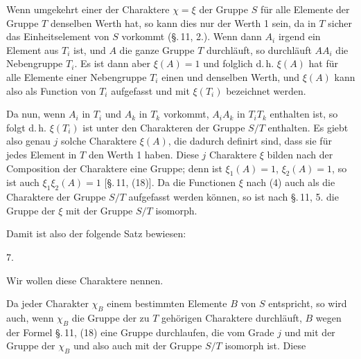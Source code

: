 
Wenn umgekehrt einer der Charaktere $\chi = \xi$ der Gruppe $S$
für alle Elemente der Gruppe $T$ denselben Werth hat, so kann
dies nur der Werth 1 sein, da in $T$ sicher das Einheitselement
von $S$ vorkommt (\S.\,11, 2.). Wenn dann $A_i$ irgend ein Element
aus $T_i$ ist, und $A$ die ganze Gruppe $T$ durchläuft, so
durchläuft $AA_i$ die Nebengruppe $T_i$. Es ist dann aber
$\xi(A) = 1$ und folglich
d.\,h. $\xi(A)$ hat für alle Elemente einer Nebengruppe $T_i$ einen
und denselben Werth, und $\xi(A)$ kann also als Function von $T_i$
aufgefasst und mit $\xi(T_i)$ bezeichnet werden.

Da nun, wenn $A_i$ in $T_i$ und $A_k$ in $T_k$ vorkommt, $A_iA_k$
in $T_iT_k$ enthalten ist, so folgt
d.\,h. $\xi(T_i)$ ist unter den Charakteren der Gruppe $S/T$
enthalten. Es giebt also genau $j$ solche Charaktere $\xi(A)$, die
dadurch definirt sind, dass sie für jedes Element in $T$ den Werth
1 haben. Diese $j$ Charaktere $\xi$ bilden nach der Composition
der Charaktere eine Gruppe; denn ist $\xi_1(A) = 1$,
$\xi_2(A) = 1$, so ist auch $\xi_1\xi_2(A) = 1$ [\S.\,11, (18)].
Da die Functionen $\xi$ nach (4) auch als die Charaktere der
Gruppe $S/T$ aufgefasst werden können, so ist nach \S.\,11, 5. die
Gruppe der $\xi$ mit der Gruppe $S/T$ isomorph.

Damit ist also der folgende Satz bewiesen:

7.\ 

Wir wollen diese Charaktere  nennen.

Da jeder Charakter $\chi_B$ einem bestimmten Elemente $B$ von $S$
entspricht, so wird auch, wenn $\chi_B$ die Gruppe der zu $T$
gehörigen Charaktere durchläuft, $B$ wegen der Formel \S.\,11, (18)
eine Gruppe durchlaufen, die vom Grade $j$ und mit der Gruppe der
$\chi_B$ und also auch mit der Gruppe $S/T$ isomorph ist. Diese
